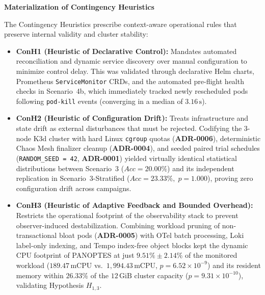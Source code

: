 \textbf{Materialization of Contingency Heuristics}

The Contingency Heuristics prescribe context-aware operational rules that preserve internal validity and cluster stability:

\begin{itemize}
    \item \textbf{ConH1 (Heuristic of Declarative Control):} Mandates automated reconciliation and dynamic service discovery over manual configuration to minimize control delay. This was validated through declarative Helm charts, Prometheus \texttt{ServiceMonitor} CRDs, and the automated pre-flight health checks in Scenario~4b, which immediately tracked newly rescheduled pods following \texttt{pod-kill} events (converging in a median of $3.16\,\text{s}$).
    
    \item \textbf{ConH2 (Heuristic of Configuration Drift):} Treats infrastructure and state drift as external disturbances that must be rejected. Codifying the 3-node K3d cluster with hard Linux \texttt{cgroup} quotas (\textbf{ADR-0006}), deterministic Chaos Mesh finalizer cleanup (\textbf{ADR-0004}), and seeded paired trial schedules (\texttt{RANDOM\_SEED = 42}, \textbf{ADR-0001}) yielded virtually identical statistical distributions between Scenario~3 ($Acc = 20.00\%$) and its independent replication in Scenario~3-Stratified ($Acc = 23.33\%, \; p = 1.000$), proving zero configuration drift across campaigns.
    
    \item \textbf{ConH3 (Heuristic of Adaptive Feedback and Bounded Overhead):} Restricts the operational footprint of the observability stack to prevent observer-induced destabilization. Combining workload pruning of non-transactional bloat pods (\textbf{ADR-0005}) with OTel batch processing, Loki label-only indexing, and Tempo index-free object blocks kept the dynamic CPU footprint of PANOPTES at just $\mathbf{9.51\% \pm 2.14\%}$ of the monitored workload ($189.47\,\text{mCPU}$ vs.\ $1{,}994.43\,\text{mCPU}$, $p = 6.52 \times 10^{-9}$) and its resident memory within $\mathbf{26.33\%}$ of the $12\,\text{GiB}$ cluster capacity ($p = 9.31 \times 10^{-10}$), validating Hypothesis $H_{1,3}$.
\end{itemize}
